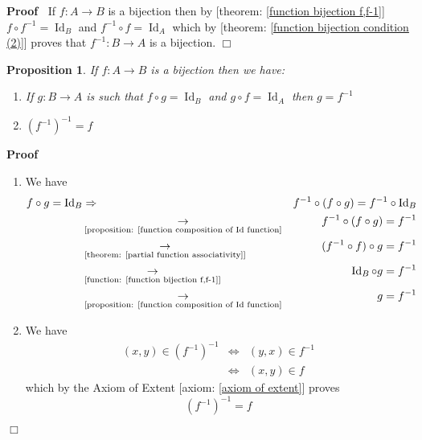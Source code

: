 \documentclass{book}
\newcommand{\Rightarrowlim}{\mathop{\rightarrow}\limits}
\newcommand{\tmop}[1]{\ensuremath{\operatorname{#1}}}
\newenvironment{proof}{\noindent\textbf{Proof\ }}{\hspace*{\fill}$\Box$\medskip}
\newtheorem{proposition}{Proposition}
{\theorembodyfont{\rmfamily}\newtheorem{remark}{Remark}}
\begin{document}
\begin{proof}
  If $f : A \rightarrow B$ is a bijection then by [theorem: \ref{function
  bijection f,f-1}] $f \circ f^{- 1} = \tmop{Id}_B$ and $f^{- 1} \circ f =
  \tmop{Id}_A$ which by [theorem: \ref{function bijection condition (2)}]
  proves that $f^{- 1} : B \rightarrow A$ is a bijection.
\end{proof}

\begin{proposition}
  \label{function inverse of a bijection is unique}If $f : A \rightarrow B$ is
  a bijection then we have:
  \begin{enumerate}
    \item If $g : B \rightarrow A$ is such that $f \circ g = \tmop{Id}_B$ and
    $g \circ f = \tmop{Id}_A$ then $g = f^{- 1}$
    
    \item $(f^{- 1})^{- 1} = f$
  \end{enumerate}
\end{proposition}

\begin{proof}
  
  \begin{enumerate}
    \item We have
    \begin{eqnarray*}
      f \circ g = \tmop{Id}_B & \Rightarrow & f^{- 1} \circ (f \circ g) = f^{-
      1} \circ \tmop{Id}_B\\
      & \Rightarrowlim_{\text{[proposition: \ref{function composition of Id
      function}}} & f^{- 1} \circ (f \circ g) = f^{- 1}\\
      & \Rightarrowlim_{\text{[theorem: \ref{partial function
      associativity}]}} & (f^{- 1} \circ f) \circ g = f^{- 1}\\
      & \Rightarrowlim_{\text{[function: \ref{function bijection f,f-1}]}} &
      \tmop{Id}_B \circ g = f^{- 1}\\
      & \Rightarrowlim_{\text{[proposition: \ref{function composition of Id
      function}}} & g = f^{- 1}
    \end{eqnarray*}
    \item We have
    \begin{eqnarray*}
      (x, y) \in (f^{- 1})^{- 1} & \Leftrightarrow & (y, x) \in f^{- 1}\\
      & \Leftrightarrow & (x, y) \in f
    \end{eqnarray*}
    which by the Axiom of Extent [axiom: \ref{axiom of extent}] proves
    \[ (f^{- 1})^{- 1} = f \]
  \end{enumerate}
\end{proof}
\end{document}
